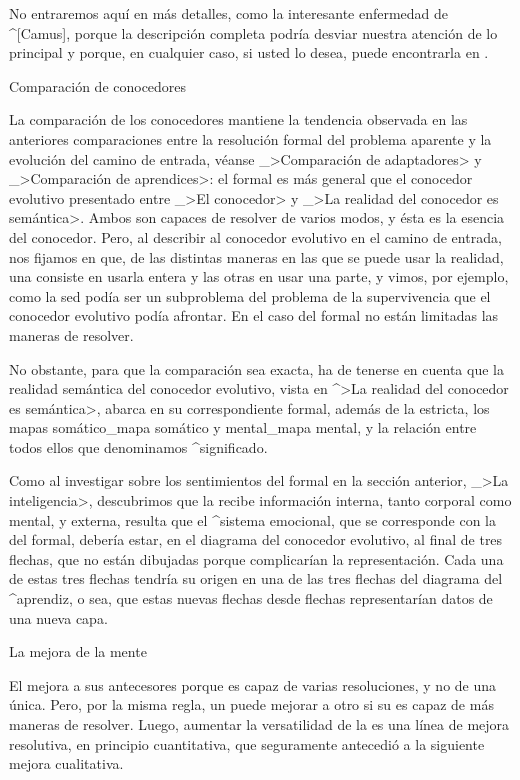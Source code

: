 No entraremos aquí en más detalles, como la interesante enfermedad de
^[Camus], porque la descripción completa podría desviar nuestra atención
de lo principal y porque, en cualquier caso, si usted lo desea, puede
encontrarla en .


\Section Comparación de conocedores

La comparación de los conocedores mantiene la tendencia observada en las
anteriores comparaciones entre la resolución formal del problema
aparente y la evolución del camino de entrada, véanse _>Comparación de
adaptadores> y _>Comparación de aprendices>: el {\conocedor} formal es
más general que el conocedor evolutivo presentado entre _>El conocedor>
y _>La realidad del conocedor es semántica>. Ambos son capaces de
resolver de varios modos, y ésta es la esencia del conocedor. Pero, al
describir al conocedor evolutivo en el camino de entrada, nos fijamos en
que, de las distintas maneras en las que se puede usar la realidad, una
consiste en usarla entera y las otras en usar una parte, y vimos, por
ejemplo, como la sed podía ser un subproblema del problema de la
supervivencia que el conocedor evolutivo podía afrontar. En el caso del
{\conocedor} formal no están limitadas las maneras de resolver.

No obstante, para que la comparación sea exacta, ha de tenerse en cuenta
que la realidad semántica del conocedor evolutivo, vista en ^>La
realidad del conocedor es semántica>, abarca en su correspondiente
{\conocedor} formal, además de la {\realidad} estricta, los mapas
somático_{mapa somático} y mental_{mapa mental}, y la relación entre
todos ellos que denominamos ^{significado}.

Como al investigar sobre los sentimientos del {\conocedor} formal en la
sección anterior, _>La inteligencia>, descubrimos que la {\inteligencia}
recibe información interna, tanto corporal como mental, y externa,
resulta que el ^{sistema emocional}, que se corresponde con la
{\inteligencia} del {\conocedor} formal, debería estar, en el diagrama
del conocedor evolutivo, al final de tres flechas, que no están
dibujadas porque complicarían la representación. Cada una de estas tres
flechas tendría su origen en una de las tres flechas del diagrama del
^{aprendiz}, o sea, que estas nuevas flechas desde flechas
representarían datos de una nueva capa.


\Section La mejora de la mente

El {\conocedor} mejora a sus antecesores porque es capaz de varias
resoluciones, y no de una única. Pero, por la misma regla, un
{\conocedor} puede mejorar a otro si su {\mente} es capaz de más maneras
de resolver. Luego, aumentar la versatilidad de la {\mente} es una línea
de mejora resolutiva, en principio cuantitativa, que seguramente
antecedió a la siguiente mejora cualitativa.


